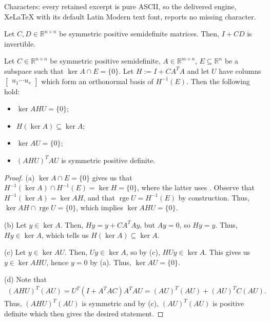 \documentclass[10pt,a4paper]{amsart}
\newcommand{\R}{\mathbb{R}}
\newcommand{\rge}{\operatorname{rge}}
\begin{document}
Characters: every retained excerpt is pure ASCII, so the delivered engine, XeLaTeX with its default Latin Modern text font, reports no missing character.
\begin{lemma}\label{lem:Hinvert}
    Let $C, D \in \R^{n \times n}$ be symmetric positive semidefinite matrices.
    Then, $I + CD$ is invertible.
\end{lemma}

\begin{lemma}\label{lem:AHUinvert}
    Let $C \in \R^{n \times n}$ be symmetric positive semidefinite, $A \in \R^{m \times n}$, $E \subseteq \R^n$
    be a subspace such that $\ker A \cap E = \{0\}$. Let $H := I + CA^TA$ and let $U$
    have columns $\begin{bmatrix}
        u_1 \cdots u_r
    \end{bmatrix}$ which form an orthonormal basis of $H^{-1}(E)$.
    Then the following hold:
    \begin{itemize}
        \item[(a)] $\ker AHU = \{0\}$;
        \item[(b)] $H(\ker A) \subseteq \ker A$;
        \item[(c)] $\ker AU = \{0\}$;
        \item[(d)] $(AHU)^T AU$ is symmetric positive definite.
    \end{itemize}
\end{lemma}

\begin{proof}
    (a) $\ker A \cap E = \{0\}$ gives us that $H^{-1} (\ker A) \cap H^{-1}(E) = \ker H=\{0\}$,  where the latter uses . Observe that  
    $H^{-1}(\ker A)=\ker AH$,   and that $\rge U =H^{-1}(E)$ by construction.  Thus,  $\ker AH \cap \rge U = \{0\}$, which implies $\ker AHU = \{0\}$.

    (b) Let $y \in \ker A$. Then, $Hy = y + C A^TAy$, but $Ay = 0$, so $Hy = y$. Thus, $Hy \in \ker A$,
    which tells us $H(\ker A) \subseteq \ker A$.

    (c) Let $y \in \ker AU$. Then, $Uy \in \ker A$, so by (c), $HUy \in \ker A$.
    This gives us $y \in \ker AHU$, hence $y=0$ by (a). Thus, $\ker AU = \{0\}$.

(d) 
Note that
 \begin{align*}
   (AHU)^T (AU) = U^T \left(I + A^TA C\right) A^TAU = (AU)^T(AU) + (AU)^TC(AU).
 \end{align*} 
Thus, $(AHU)^T (AU)$ is symmetric and  by (c),  $(AU)^T(AU)$ is positive definite which then gives the desired statement.
\end{proof}
\end{document}
